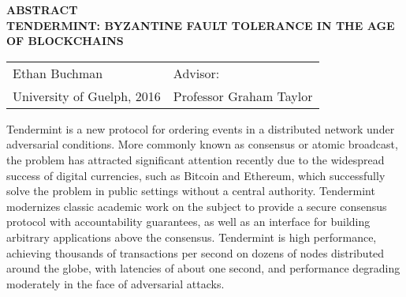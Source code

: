 
\thispagestyle{plain}
\begin{center}
    \textbf{ABSTRACT} \\ 
    \vspace{0.6cm}
    \textbf{TENDERMINT: BYZANTINE FAULT TOLERANCE IN THE AGE OF BLOCKCHAINS}
\end{center}
    
\vspace{0.6cm}
\begin{tabular}{ p{} p{} }
Ethan Buchman & Advisor:\\ 
University of Guelph, 2016 & Professor Graham Taylor
\end{tabular}


\vspace{0.9cm}
Tendermint is a new protocol for ordering events in a distributed network under adversarial conditions.
More commonly known as consensus or atomic broadcast, the problem has attracted significant attention
recently due to the widespread success of digital currencies, such as Bitcoin and Ethereum,
which successfully solve the problem in public settings without a central authority.
Tendermint modernizes classic academic work on the subject to provide a secure consensus protocol with 
accountability guarantees, as well as an interface for building arbitrary applications above the consensus.
Tendermint is high performance, achieving thousands of transactions per second on dozens of nodes distributed around the globe,
with latencies of about one second, and performance degrading moderately in the face of adversarial attacks.

\clearpage

